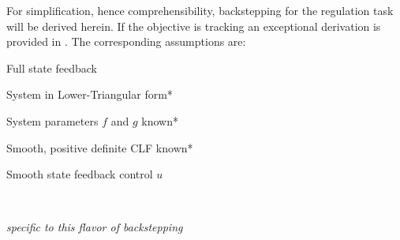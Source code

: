 \documentclass[12pt]{ucthesis}
\begin{document}
For simplification, hence comprehensibility, backstepping for the regulation task will be derived herein. If the objective is tracking an exceptional derivation is provided in \citet[Sec. 5.3.1]{Farrell2006}. The corresponding assumptions are:
\begin{ass} \alignright
	\vspace{1em}
	\begin{itemize}[labelindent=\parindent,leftmargin=.5in,noitemsep,nosep]
		\begin{minipage}{0.5\linewidth}
			\item Full state feedback
			\item System in Lower-Triangular form*
			\item System parameters $f$ and $g$ known*
		\end{minipage}
		\begin{minipage}{0.5\linewidth}
			\item Smooth, positive definite CLF known*
			\item Smooth state feedback control $u$
			\item[] ~
		\end{minipage}
	\end{itemize} \label{ass: backstepping1}
	\alignright *\textit{\small{specific to this flavor of backstepping}}
\end{ass}
\end{document}
